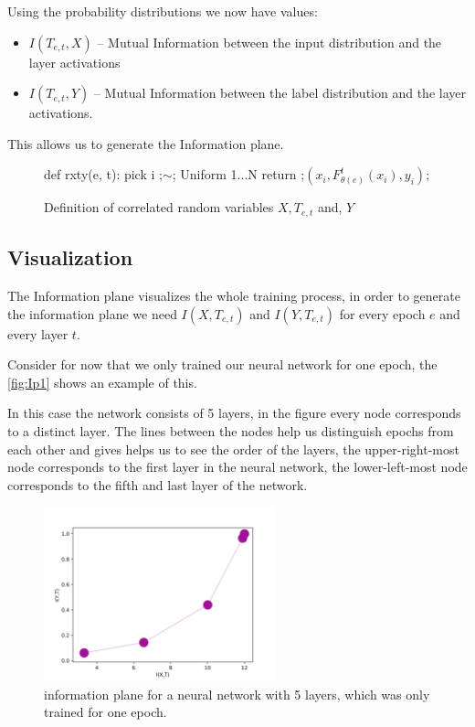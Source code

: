 Using the probability distributions we now have values:
\begin{itemize}
  \item{
      $I(T_{e,t}, X)$ -- Mutual Information between the input distribution and the
      layer activations 
    }
  \item{
      $I(T_{e,t}, Y)$ -- Mutual Information between the label distribution and the
      layer activations.
    }
\end{itemize}
This allows us to generate the Information plane.


\begin{figure}[H]
    \begin{pythonfigure}
      def rxty(e, t):
        pick i ;$\sim$; Uniform {1...N}
        return ;$(x_i, F_{\theta(e)}^t(x_i), y_i)$;
    \end{pythonfigure}
    \caption{Definition of correlated random variables $X, T_{e,t}$ and, $Y$}
    \label{fig:rxty}
\end{figure}

\subsection{Visualization}

The Information plane visualizes the whole training process, in order to
generate the information plane we need $I(X,T_{e,t})$ and $I(Y,T_{e,t})$ for every
epoch $e$ and every layer $t$.

Consider for now that we only trained our neural network for one epoch, the
\autoref{fig:Ip1} shows an example of this. 

In this case the network consists of 5 layers, in the figure every node
corresponds to a distinct layer. The lines between the nodes help us distinguish
epochs from each other and gives helps us to see the order of the layers, the
upper-right-most node corresponds to the first layer in the neural network, the
lower-left-most node corresponds to the fifth and last layer of the network.

\begin{figure}[H]
  \centering
  \includegraphics[width=0.60\textwidth]{figs/ip_1v2.png}
  \caption{
    information plane for a neural network with 5 layers, which was only trained
    for one epoch.
  }
  \label{fig:Ip1}
\end{figure}

